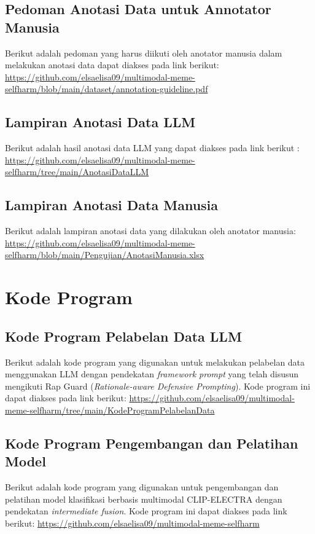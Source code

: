 \subsection{Pedoman Anotasi Data untuk Annotator Manusia}
Berikut adalah pedoman yang harus diikuti oleh anotator manusia dalam melakukan anotasi data dapat diakses pada link berikut: \href{https://github.com/elsaelisa09/multimodal-meme-selfharm/blob/main/dataset/annotation-guideline.pdf}{https://github.com/elsaelisa09/multimodal-meme-selfharm/blob/main/dataset/annotation-guideline.pdf}

\subsection{Lampiran Anotasi Data LLM}
Berikut adalah hasil anotasi data LLM yang dapat diakses pada link berikut : \href{https://github.com/elsaelisa09/multimodal-meme-selfharm/tree/main/Anotasi%20Data%20LLM}{https://github.com/elsaelisa09/multimodal-meme-selfharm/tree/main/AnotasiDataLLM}

\subsection{Lampiran Anotasi Data Manusia}
Berikut adalah lampiran anotasi data yang dilakukan oleh anotator manusia: \href{https://github.com/elsaelisa09/multimodal-meme-selfharm/blob/main/Pengujian/Anotasi%20Manusia%20.xlsx}{https://github.com/elsaelisa09/multimodal-meme-selfharm/blob/main/Pengujian/AnotasiManusia.xlsx}

\section{Kode Program}
\subsection{Kode Program Pelabelan Data LLM}
Berikut adalah kode program yang digunakan untuk melakukan pelabelan data menggunakan LLM dengan pendekatan \textit{framework prompt} yang telah disusun mengikuti Rap Guard (\textit{Rationale-aware Defensive Prompting}). Kode program ini dapat diakses pada link berikut: \href{https://github.com/elsaelisa09/multimodal-meme-selfharm/tree/main/Kode%20Program%20Pelabelan%20Data}{https://github.com/elsaelisa09/multimodal-meme-selfharm/tree/main/KodeProgramPelabelanData}
\subsection{Kode Program Pengembangan dan Pelatihan Model}
Berikut adalah kode program yang digunakan untuk pengembangan dan pelatihan model klasifikasi berbasis multimodal CLIP-ELECTRA dengan pendekatan \textit{intermediate fusion}. Kode program ini dapat diakses pada link berikut: \href{https://github.com/elsaelisa09/multimodal-meme-selfharm}{https://github.com/elsaelisa09/multimodal-meme-selfharm}

